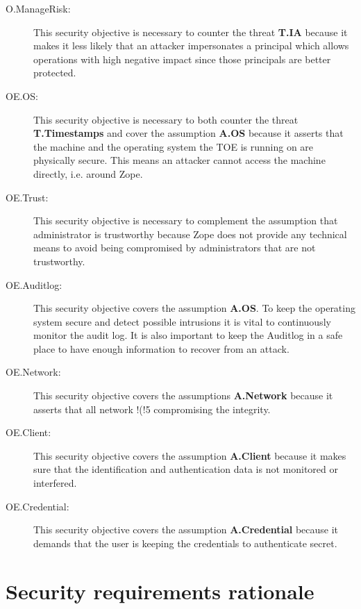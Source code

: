 \documentclass[12pt,english]{scrbook}
\begin{document}
\begin{description}
  \item[O.ManageRisk:] This security objective is necessary to counter the
  threat \textbf{T.IA} because it makes it less likely that an attacker
  impersonates a principal which allows operations with high negative impact
  since those principals are better protected.

  \item[OE.OS:] This security objective is necessary to both counter the
  threat \textbf{T.Timestamps} and cover the assumption \textbf{A.OS} because
  it asserts that the machine and the operating system the TOE is running on
  are physically secure. This means an attacker cannot access the machine
  directly, i.e. around Zope.

  \item[OE.Trust:] This security objective is necessary to complement the
      assumption that administrator is trustworthy because Zope does not provide any
      technical means to avoid being compromised by administrators that are
      not trustworthy.

  \item[OE.Auditlog:] This security objective covers the assumption
  \textbf{A.OS}. To keep the operating system secure and detect possible
  intrusions it is vital to continuously monitor the audit log. It is also
  important to keep the Auditlog in a safe place to have enough information to
  recover from an attack.

  \item[OE.Network:] This security objective covers the assumptions
  \textbf{A.Network} because it asserts that all
  network !(!5
  compromising the integrity.

  \item[OE.Client:] This security objective covers the assumption
  \textbf{A.Client} because it makes sure that the identification and
  authentication data is not monitored or interfered.

  \item[OE.Credential:] This security objective covers the assumption
  \textbf{A.Credential} because it demands that the user is keeping the
  credentials to authenticate secret.
  
\end{description}



\section{Security requirements rationale}
\end{document}

